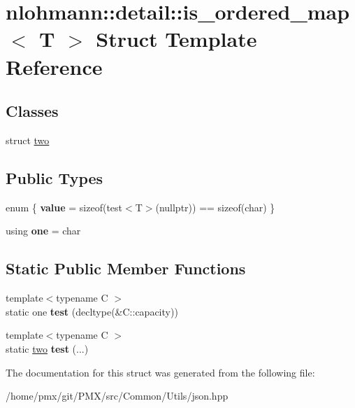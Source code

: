 \hypertarget{structnlohmann_1_1detail_1_1is__ordered__map}{}\section{nlohmann\+:\+:detail\+:\+:is\+\_\+ordered\+\_\+map$<$ T $>$ Struct Template Reference}
\label{structnlohmann_1_1detail_1_1is__ordered__map}
\subsection*{Classes}
\begin{DoxyCompactItemize}
\item 
struct \hyperlink{structnlohmann_1_1detail_1_1is__ordered__map_1_1two}{two}
\end{DoxyCompactItemize}
\subsection*{Public Types}
\begin{DoxyCompactItemize}
\item 
\mbox{\label{structnlohmann_1_1detail_1_1is__ordered__map_a12afd574920e18a31f19758f545d07ff}} 
enum \{ {\bfseries value} = sizeof(test$<$T$>$(nullptr)) == sizeof(char)
 \}
\item 
\mbox{\label{structnlohmann_1_1detail_1_1is__ordered__map_a99a559f257bee6888355dc2d18ed2a17}} 
using {\bfseries one} = char
\end{DoxyCompactItemize}
\subsection*{Static Public Member Functions}
\begin{DoxyCompactItemize}
\item 
\mbox{\label{structnlohmann_1_1detail_1_1is__ordered__map_adae06dbd38b0f19c5930d37db1a476b1}} 
{\footnotesize template$<$typename C $>$ }\\static one {\bfseries test} (decltype(\&C\+::capacity))
\item 
\mbox{\label{structnlohmann_1_1detail_1_1is__ordered__map_ac566c43218f7753a8c7c1867c907d1c4}} 
{\footnotesize template$<$typename C $>$ }\\static \hyperlink{structnlohmann_1_1detail_1_1is__ordered__map_1_1two}{two} {\bfseries test} (...)
\end{DoxyCompactItemize}


The documentation for this struct was generated from the following file\+:\begin{DoxyCompactItemize}
\item 
/home/pmx/git/\+P\+M\+X/src/\+Common/\+Utils/json.\+hpp\end{DoxyCompactItemize}
